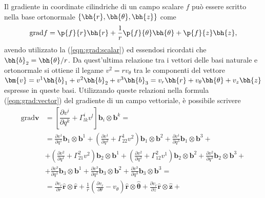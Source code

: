 \begin{example}
 Il gradiente in coordinate cilindriche di un campo scalare $f$ può essere scritto nella base ortonormale $\{ \bh{r}, \bh{\theta},\bh{z} \}$ come
\begin{equation}
 \text{grad} f = \p{f}{r} \bh{r} + \dfrac{1}{r}\p{f}{\theta} \bh{\theta} +
   \p{f}{z} \bh{z} ,
\end{equation}
 avendo utilizzato la (\ref{eqn:grad:scalar}) ed essendosi ricordati che $\bh{b}_2 = \bh{\theta} / r$. Da quest'ultima relazione tra i vettori delle basi naturale e ortonormale si ottiene il legame $v^2 = r v_{\theta}$ tra le componenti del vettore $\bm{v} = v^1 \bh{b}_1 + v^2 \bh{b}_2 + v^3 \bh{b}_3 = v_r \bh{r} + v_{\theta} \bh{\theta} + v_z \bh{z}$ espresse in queste basi. Utilizzando queste relazioni nella formula (\ref{eqn:grad:vector}) del gradiente di un campo vettoriale, è possibile scrivere
\begin{equation}
\begin{aligned}
    \text{grad} \bm{v} & = \left[ \dfrac{\partial v^i}{\partial q^k} + \Gamma_{lk}^i v^l \right] \bm{b}_i \otimes \bm{b}^k = \\
     & = \frac{\partial v^1}{\partial q^1}                                   \bm{b}_1 \otimes \bm{b}^1   + 
        \left( \frac{\partial v^1}{\partial q^2} + \Gamma_{22}^1 v^2 \right) \bm{b}_1 \otimes \bm{b}^2   + 
        \frac{\partial v^1}{\partial q^3}                                    \bm{b}_1 \otimes \bm{b}^3   + \\
     & + \left( \frac{\partial v^2}{\partial q^1} + \Gamma_{21}^2 v^2 \right)\bm{b}_2 \otimes \bm{b}^1   + 
        \left( \frac{\partial v^2}{\partial q^2} + \Gamma_{12}^2 v^1 \right) \bm{b}_2 \otimes \bm{b}^2   + 
        \frac{\partial v^2}{\partial q^3}                                    \bm{b}_2 \otimes \bm{b}^3   + \\
     & + \frac{\partial v^3}{\partial q^1}                                   \bm{b}_3 \otimes \bm{b}^1   + 
        \frac{\partial v^3}{\partial q^2}                                    \bm{b}_3 \otimes \bm{b}^2   + 
        \frac{\partial v^3}{\partial q^3}                                    \bm{b}_3 \otimes \bm{b}^3   = \\
     & = \frac{\partial v_r}{\partial r}                                     \bm{\hat{r}} \otimes \bm{\hat{r}}   + 
        \frac{1}{r}\left( \frac{\partial v_r}{\partial \theta} - v_\theta \right) \bm{\hat{r}} \otimes \bm{\hat{\theta}}  + 
        \frac{\partial v_r}{\partial z}                                     \bm{\hat{r}} \otimes \bm{\hat{z}}  + \\

\end{aligned}
\end{equation}
\end{example}
